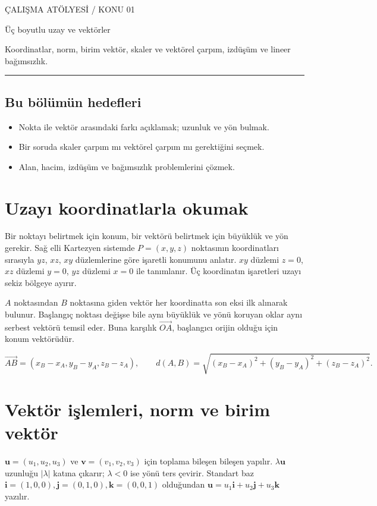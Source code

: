 
{\sffamily\small\color{accent} ÇALIŞMA ATÖLYESİ / KONU 01\par}
\vspace{8mm}
{\Huge\sffamily\bfseries\raggedright{} Üç boyutlu uzay ve vektörler\par}
\vspace{3mm}
{\large Koordinatlar, norm, birim vektör, skaler ve vektörel çarpım, izdüşüm ve lineer bağımsızlık.\par}
\vspace{4mm}\hrule\vspace{4mm}\subsection*{Bu bölümün hedefleri}\begin{itemize}
\item Nokta ile vektör arasındaki farkı açıklamak; uzunluk ve yön bulmak.
\item Bir soruda skaler çarpım mı vektörel çarpım mı gerektiğini seçmek.
\item Alan, hacim, izdüşüm ve bağımsızlık problemlerini çözmek.\end{itemize}
{\small\tableofcontents}\clearpage
\section{Uzayı koordinatlarla okumak}
Bir noktayı belirtmek için konum, bir vektörü belirtmek için büyüklük ve yön gerekir. Sağ elli Kartezyen sistemde \(P=(x,y,z)\) noktasının koordinatları sırasıyla \(yz\), \(xz\), \(xy\) düzlemlerine göre işaretli konumunu anlatır. \(xy\) düzlemi \(z=0\), \(xz\) düzlemi \(y=0\), \(yz\) düzlemi \(x=0\) ile tanımlanır. Üç koordinatın işaretleri uzayı sekiz bölgeye ayırır.

\(A\) noktasından \(B\) noktasına giden vektör her koordinatta son eksi ilk alınarak bulunur. Başlangıç noktası değişse bile aynı büyüklük ve yönü koruyan oklar aynı serbest vektörü temsil eder. Buna karşılık \(\overrightarrow{OA}\), başlangıcı orijin olduğu için konum vektörüdür.


{\small\[
\overrightarrow{AB}=(x_B-x_A,y_B-y_A,z_B-z_A),\qquad d(A,B)=\sqrt{(x_B-x_A)^2+(y_B-y_A)^2+(z_B-z_A)^2}.
\]}
\section{Vektör işlemleri, norm ve birim vektör}
\(\mathbf u=(u_1,u_2,u_3)\) ve \(\mathbf v=(v_1,v_2,v_3)\) için toplama bileşen bileşen yapılır. \(\lambda\mathbf u\) uzunluğu \(|\lambda|\) katına çıkarır; \(\lambda<0\) ise yönü ters çevirir. Standart baz \(\mathbf i=(1,0,0),\mathbf j=(0,1,0),\mathbf k=(0,0,1)\) olduğundan \(\mathbf u=u_1\mathbf i+u_2\mathbf j+u_3\mathbf k\) yazılır.


